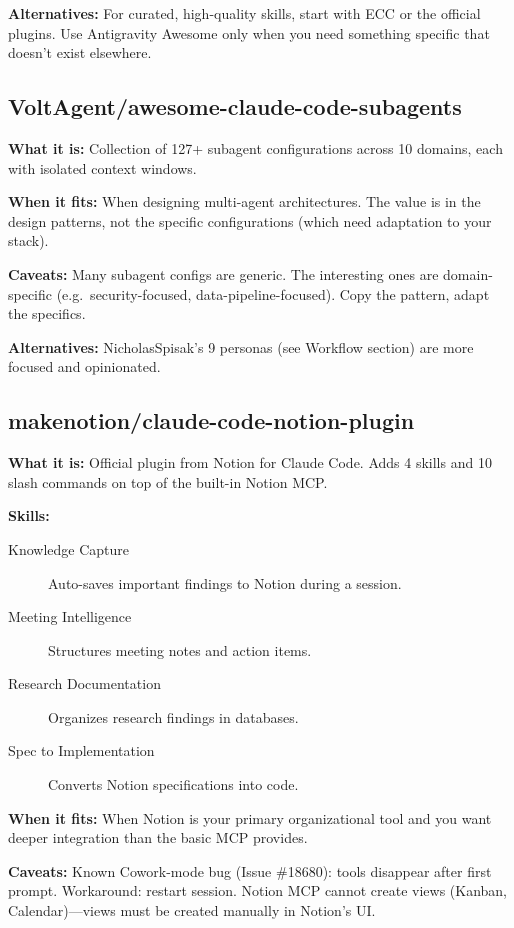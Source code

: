 \documentclass[11pt,a4paper]{article}
\begin{document}
\textbf{Alternatives:} For curated, high-quality skills, start with ECC or the official plugins. Use Antigravity Awesome only when you need something specific that doesn't exist elsewhere.

\subsection{VoltAgent/awesome-claude-code-subagents}

\textbf{What it is:} Collection of 127+ subagent configurations across 10 domains, each with isolated context windows.

\textbf{When it fits:} When designing multi-agent architectures. The value is in the design patterns, not the specific configurations (which need adaptation to your stack).

\textbf{Caveats:} Many subagent configs are generic. The interesting ones are domain-specific (e.g.\ security-focused, data-pipeline-focused). Copy the pattern, adapt the specifics.

\textbf{Alternatives:} NicholasSpisak's 9 personas (see Workflow section) are more focused and opinionated.

\subsection{makenotion/claude-code-notion-plugin}

\textbf{What it is:} Official plugin from Notion for Claude Code. Adds 4 skills and 10 slash commands on top of the built-in Notion MCP.

\textbf{Skills:}
\begin{description}
  \item[Knowledge Capture] Auto-saves important findings to Notion during a session.
  \item[Meeting Intelligence] Structures meeting notes and action items.
  \item[Research Documentation] Organizes research findings in databases.
  \item[Spec to Implementation] Converts Notion specifications into code.
\end{description}

\textbf{When it fits:} When Notion is your primary organizational tool and you want deeper integration than the basic MCP provides.

\textbf{Caveats:} Known Cowork-mode bug (Issue \#18680): tools disappear after first prompt. Workaround: restart session. Notion MCP cannot create views (Kanban, Calendar)---views must be created manually in Notion's UI.
\end{document}
